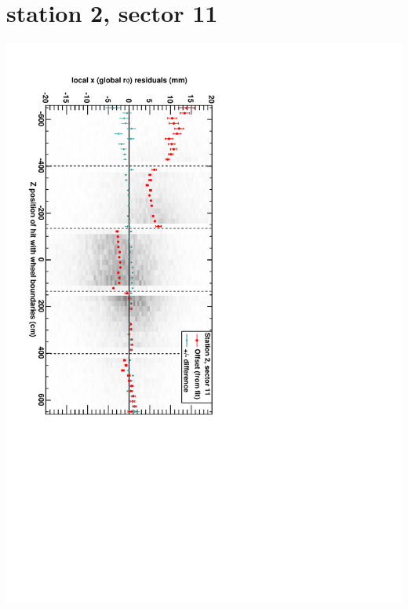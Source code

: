 \documentclass[compress]{beamer}
\begin{document}
\section*{station 2, sector 11}
\begin{frame} \vfill \mbox{\hspace{-1 cm}\includegraphics[height=1.2\linewidth, angle=90]{DTrphiVsZ_st2_sr11.pdf}} \end{frame}
\end{document}
